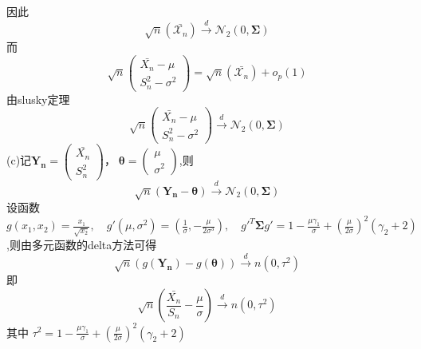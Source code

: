 \documentclass[11pt,a4paper]{ctexart}
\begin{document}
        因此\[\sqrt{n}(\bar{\mathcal{X}_n}) \overset{d}{\to} \mathcal{N}_2(0,\boldsymbol{\Sigma})\]
        而\[\sqrt{n}\begin{pmatrix}
                    \bar{X_n} - \mu\\
                    S_n^2 - \sigma^2
                    \end{pmatrix} = \sqrt{n}(\bar{\mathcal{X}_n}) + o_p(1)\]
        由slusky定理\[\sqrt{n}\begin{pmatrix}
            \bar{X_n} - \mu\\
            S_n^2 - \sigma^2
            \end{pmatrix} \overset{d}{\to} \mathcal{N}_2(0,\boldsymbol{\Sigma})\]
        (c)记\(\boldsymbol{Y_n} = \begin{pmatrix}
                    \bar{X_n} \\
                    S_n^2
                    \end{pmatrix} ，\; \boldsymbol{\theta} = \begin{pmatrix}
                                        \mu \\
                                        \sigma^2
                                        \end{pmatrix}\),则
                                        \[ \sqrt{n}(\boldsymbol{Y_n} -\boldsymbol{\theta}) \overset{d}{\to}\mathcal{N}_2(0,\boldsymbol{\Sigma}) \]
            设函数\(\displaystyle g(x_1,x_2) = \frac{x_1}{\sqrt{x_2}}, \quad g'(\mu,\sigma^2) = (
            \frac{1}{\sigma},  -\frac{\mu}{2\sigma^3}
            ) ,\quad  g'^{T}\boldsymbol{\Sigma}g' =1 - \frac{\mu\gamma_1}{\sigma} + (\frac{\mu}{2\sigma})^2(\gamma_2 + 2) \),则由多元函数的delta方法可得
            \[\sqrt{n}(g(\boldsymbol{Y_n}) - g(\boldsymbol{\theta}) ) \overset{d}{\to} n(0,\tau^2)\]
            即\[ \sqrt{n}(\frac{\bar{X_n}}{S_n} - \frac{\mu}{\sigma}) \overset{d}{\to} n(0,\tau^2) \]
            其中 \( \tau^2 = 1 - \frac{\mu\gamma_1}{\sigma} + (\frac{\mu}{2\sigma})^2(\gamma_2 + 2) \)
            
\end{document}
